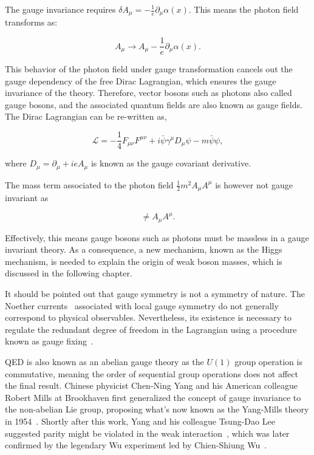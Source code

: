 The gauge invariance requires $\delta A_{\mu}=-\frac{1}{e}\partial_{\mu}\alpha(x)$. This means the photon field transforms as:

\begin{equation}
A_{\mu}\rightarrow A_{\mu}-\frac{1}{e}\partial_{\mu}\alpha(x).
\end{equation}

This behavior of the photon field under gauge transformation cancels out the gauge dependency of the free Dirac Lagrangian, which ensures the gauge invariance of the theory. Therefore, vector bosons such as photons also called gauge bosons, and the associated quantum fields are also known as gauge fields. The Dirac Lagrangian can be re-written as,

\begin{equation}
\label{eq:QEDCov}
\mathcal{L}=-\frac{1}{4}F_{\mu\nu}F^{\mu\nu}+i\bar{\psi}\gamma^{\mu}D_{\mu}\psi-m\bar{\psi}\psi,
\end{equation}

where $D_{\mu}=\partial_{\mu}+ieA_{\mu}$ is known as the gauge covariant derivative. 

The mass term associated to the photon field $\frac{1}{2}m^2A_{\mu}A^{\mu}$ is however not gauge invariant as

\begin{equation}
[A_{\mu}-\frac{1}{e}\partial_{\mu}\alpha(x)][A^{\mu}-\frac{1}{e}\partial^{\mu}\alpha(x)]\neq A_{\mu}A^{\mu}.
\end{equation}

Effectively, this means gauge bosons such as photons must be massless in a gauge invariant theory. As a consequence, a new mechanism, known as the Higgs mechanism, is needed to explain the origin of weak boson masses, which is discussed in the following chapter. 

It should be pointed out that gauge symmetry is not a symmetry of nature. The Noether currents~\cite{Noether1918} associated with local gauge symmetry do not generally correspond to physical observables. Nevertheless, its existence is necessary to regulate the redundant degree of freedom in the Lagrangian using a procedure known as gauge fixing~\cite{SCHWARTZ}. 

\ac{QED} is also known as an abelian gauge theory as the $U(1)$ group operation is commutative, meaning the order of sequential group operations does not affect the final result. Chinese physicist Chen-Ning Yang and his American colleague Robert Mills at Brookhaven first generalized the concept of gauge invariance to the non-abelian Lie group, proposing what's now known as the Yang-Mills theory in 1954~\cite{Yang:1954ek}. Shortly after this work, Yang and his colleague Tsung-Dao Lee suggested parity might be violated in the weak interaction~\cite{Lee:1956qn}, which was later confirmed by the legendary Wu experiment led by Chien-Shiung Wu~\cite{Wu:1957my}. 

